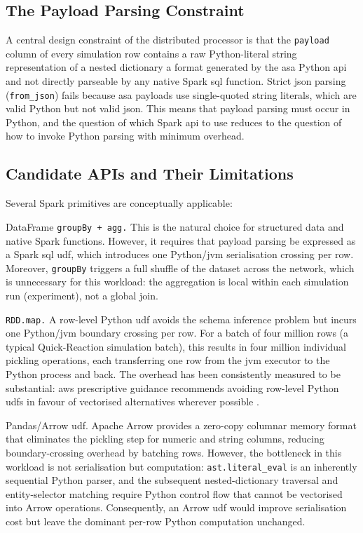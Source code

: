 \subsection{The Payload Parsing Constraint}
\label{subsec:cap4-the-payload-parsing-constraint}

A central design constraint of the distributed processor is that the \texttt{payload} column
of every simulation row contains a raw Python-literal string representation of a nested
dictionary a format generated by the \gls{asa} Python \gls{api} and not directly parseable
by any native Spark \gls{sql} function.  Strict \gls{json} parsing (\texttt{from\_json}) fails
because \gls{asa} payloads use single-quoted string literals, which are valid Python but not
valid \gls{json}.  This means that payload parsing must occur in Python, and the question of
which Spark \gls{api} to use reduces to the question of how to invoke Python parsing with
minimum overhead.

\subsection{Candidate APIs and Their Limitations}
\label{subsec:cap4-candidate-apis-and-their-limitations}

Several Spark primitives are conceptually applicable:

DataFrame \texttt{groupBy + \texttt{agg}.} This is the natural choice for
structured data and native Spark functions.  However, it requires that payload parsing be
expressed as a Spark \gls{sql} \gls{udf}, which introduces one Python/\gls{jvm}
serialisation crossing per row.  Moreover, \texttt{groupBy} triggers a full shuffle of the
dataset across the network, which is unnecessary for this workload: the aggregation is local
within each simulation run (experiment), not a global join.

\texttt{RDD.map.} A row-level Python \gls{udf} avoids the schema inference problem
but incurs one Python/\gls{jvm} boundary crossing per row.  For a batch of four million rows
(a typical Quick-Reaction simulation batch), this results in four million individual pickling
operations, each transferring one row from the \gls{jvm} executor to the Python process and
back.  The overhead has been consistently measured to be substantial: \gls{aws} prescriptive
guidance recommends avoiding row-level Python \glspl{udf} in favour of vectorised alternatives
wherever possible \parencite{awsudf2023}.

Pandas/Arrow \gls{udf}. Apache Arrow \parencite{apachearrow2016} provides a
zero-copy columnar memory format that eliminates the pickling step for numeric and string
columns, reducing boundary-crossing overhead by batching rows.  However, the bottleneck in this
workload is not serialisation but computation: \texttt{ast.literal\_eval} is an inherently
sequential Python parser, and the subsequent nested-dictionary traversal and entity-selector
matching require Python control flow that cannot be vectorised into Arrow operations.
Consequently, an Arrow \gls{udf} would improve serialisation cost but leave the dominant
per-row Python computation unchanged.

